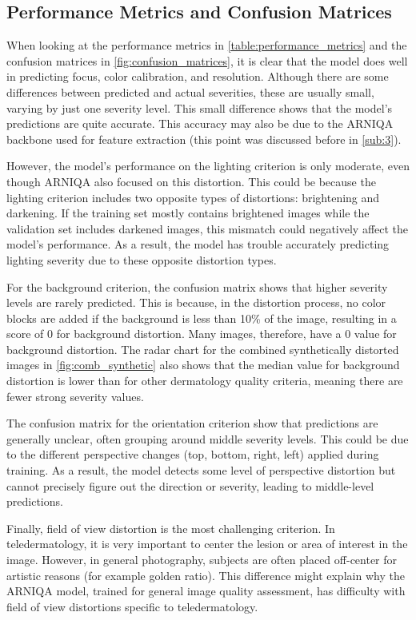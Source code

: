 \subsection{Performance Metrics and Confusion Matrices}
\label{sub:3}
When looking at the performance metrics in \autoref{table:performance_metrics} and the confusion matrices in \autoref{fig:confusion_matrices}, it is clear that the model does well in predicting focus, color calibration, and resolution. Although there are some differences between predicted and actual severities, these are usually small, varying by just one severity level. This small difference shows that the model’s predictions are quite accurate. This accuracy may also be due to the ARNIQA backbone used for feature extraction (this point was discussed before in \autoref{sub:3}).\par
\vspace{\baselineskip}
\noindent
However, the model’s performance on the lighting criterion is only moderate, even though ARNIQA also focused on this distortion. This could be because the lighting criterion includes two opposite types of distortions: brightening and darkening. If the training set mostly contains brightened images while the validation set includes darkened images, this mismatch could negatively affect the model’s performance. As a result, the model has trouble accurately predicting lighting severity due to these opposite distortion types. \par
\clearpage
\noindent
For the background criterion, the confusion matrix shows that higher severity levels are rarely predicted. This is because, in the distortion process, no color blocks are added if the background is less than 10\% of the image, resulting in a score of 0 for background distortion. Many images, therefore, have a 0 value for background distortion. The radar chart for the combined synthetically distorted images in \autoref{fig:comb_synthetic} also shows that the median value for background distortion is lower than for other dermatology quality criteria, meaning there are fewer strong severity values. \par
\vspace{\baselineskip}
\noindent
The confusion matrix for the orientation criterion show that predictions are generally unclear, often grouping around middle severity levels. This could be due to the different perspective changes (top, bottom, right, left) applied during training. As a result, the model detects some level of perspective distortion but cannot precisely figure out the direction or severity, leading to middle-level predictions. \par
\vspace{\baselineskip}
\noindent
Finally, field of view distortion is the most challenging criterion. In teledermatology, it is very important to center the lesion or area of interest in the image. However, in general photography, subjects are often placed off-center for artistic reasons (for example golden ratio). This difference might explain why the ARNIQA model, trained for general image quality assessment, has difficulty with field of view distortions specific to teledermatology. \par


